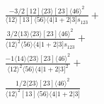 \documentclass[varwidth, border=5pt]{standalone}
\begin{document}
\begin{my}
$\begin{gathered}
\scriptscriptstyle\frac{-3/2[12]⟨23⟩[23]⟨46⟩^2}{⟨12⟩[13]⟨56⟩⟨4|1+2|3]s_{123}}+\\
\scriptscriptstyle\frac{3/2⟨13⟩⟨23⟩[23]⟨46⟩^2}{⟨12⟩^2⟨56⟩⟨4|1+2|3]s_{123}}+\\
\scriptscriptstyle\frac{-1⟨14⟩⟨23⟩[23]⟨46⟩^2}{⟨12⟩^2⟨56⟩⟨4|1+2|3]^2}+\\
\scriptscriptstyle\frac{1/2⟨23⟩[23]⟨46⟩^2}{⟨12⟩^2[13]⟨56⟩⟨4|1+2|3]}\phantom{+}
\end{gathered}$
\end{my}
\end{document}
